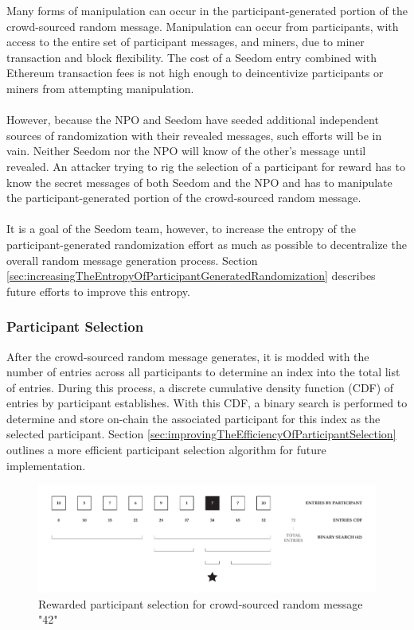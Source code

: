 \documentclass[11pt]{article}
\begin{document}
Many forms of manipulation can occur in the participant-generated portion of the crowd-sourced random message. Manipulation can occur from participants, with access to the entire set of participant messages, and miners, due to miner transaction and block flexibility. The cost of a Seedom entry combined with Ethereum transaction fees is not high enough to deincentivize participants or miners from attempting manipulation.\\\\
However, because the NPO and Seedom have seeded additional independent sources of randomization with their revealed messages, such efforts will be in vain. Neither Seedom nor the NPO will know of the other's message until revealed. An attacker trying to rig the selection of a participant for reward has to know the secret messages of both Seedom and the NPO and has to manipulate the participant-generated portion of the crowd-sourced random message.\\\\
It is a goal of the Seedom team, however, to increase the entropy of the participant-generated randomization effort as much as possible to decentralize the overall random message generation process. Section \ref{sec:increasingTheEntropyOfParticipantGeneratedRandomization} describes future efforts to improve this entropy.

\subsubsection{Participant Selection}

After the crowd-sourced random message generates, it is modded with the number of entries across all participants to determine an index into the total list of entries. During this process, a discrete cumulative density function (CDF) of entries by participant establishes. With this CDF, a binary search is performed to determine and store on-chain the associated participant for this index as the selected participant. Section \ref{sec:improvingTheEfficiencyOfParticipantSelection} outlines a more efficient participant selection algorithm for future implementation.

\begin{figure}[H]
\begin{center}
\includegraphics[width=1.0\textwidth]{./graphics/rewarded-participant-selection.pdf}
\caption{Rewarded participant selection for crowd-sourced random message "42"}
\label{figure:participantSelection}
\end{center}
\end{figure}
\end{document}

